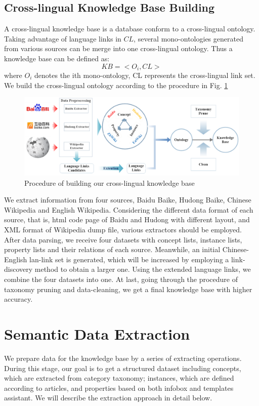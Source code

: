 \documentclass[runningheads,a4paper]{llncs}
\begin{document}
\subsection{Cross-lingual Knowledge Base Building}
A cross-lingual knowledge base is a database conform to a cross-lingual ontology. Taking advantage of language links in $CL$, several mono-ontologies generated from various sources can be merge into one cross-lingual ontology.  Thus a knowledge base can be defined as:
\begin{equation}
    KB = <O_{i}, CL>
\end{equation}
where $O_{i}$ denotes the ith mono-ontology, CL represents the cross-lingual link set.
We build the cross-lingual ontology according to the procedure in Fig. \ref{fig:procedure}
\begin{figure}[ht]
    \centerline{\includegraphics[width=1\columnwidth]{fig/procedure}}
    \label{fig:procedure}
    \caption{Procedure of building our cross-lingual knowledge base}
\end{figure}%
We extract information from four sources, Baidu Baike, Hudong Baike, Chinese Wikipedia and English Wikipedia. Considering the different data format of each source, that is, html code page of Baidu and Hudong with different layout, and XML format of Wikipedia dump file, various extractors should be employed. After data parsing, we receive four datasets with concept lists, instance lists, property lists and their relations of each source. Meanwhile, an initial Chinese-English lan-link set is generated, which will be increased by employing a link-discovery method to obtain a larger one. Using the extended language links, we combine the four datasets into one. At last, going through the procedure of taxonomy pruning and data-cleaning, we get a final knowledge base with higher accuracy.

\section{Semantic Data Extraction}
\label{sec:dp}
We prepare data for the knowledge base by a series of extracting operations. During this stage, our goal is to get a structured dataset including concepts, which are extracted from category taxonomy; instances, which are defined according to articles, and properties based on both infobox and templates assistant. We will describe the extraction approach in detail below.
\end{document}
